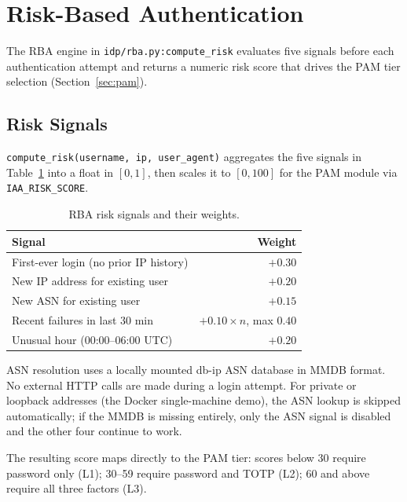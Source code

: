 \section{Risk-Based Authentication}
\label{sec:rba}

The RBA engine in \texttt{idp/rba.py:compute\_risk} evaluates five signals
before each authentication attempt and returns a numeric risk score that
drives the PAM tier selection (Section~\ref{sec:pam}).

\subsection{Risk Signals}
\texttt{compute\_risk(username, ip, user\_agent)} aggregates the five
signals in Table~\ref{tab:rba-signals} into a float in $[0, 1]$, then
scales it to $[0, 100]$ for the PAM module via \texttt{IAA\_RISK\_SCORE}.

\begin{table}[t]
\centering
\caption{RBA risk signals and their weights.}
\label{tab:rba-signals}
\renewcommand{\arraystretch}{1.2}
\scriptsize
\begin{tabular}{lr}
\toprule
\textbf{Signal} & \textbf{Weight} \\
\midrule
First-ever login (no prior IP history) & $+0.30$ \\
New IP address for existing user        & $+0.20$ \\
New ASN for existing user               & $+0.15$ \\
Recent failures in last 30 min          & $+0.10 \times n$, max $0.40$ \\
Unusual hour (00:00--06:00 UTC)         & $+0.20$ \\
\bottomrule
\end{tabular}
\end{table}

ASN resolution uses a locally mounted db-ip ASN database in MMDB format.
No external HTTP calls are made during a login attempt.
For private or loopback addresses (the Docker single-machine demo), the
ASN lookup is skipped automatically; if the MMDB is missing entirely, only
the ASN signal is disabled and the other four continue to work.

The resulting score maps directly to the PAM tier:
scores below 30 require password only (L1);
30--59 require password and TOTP (L2);
60 and above require all three factors (L3).

